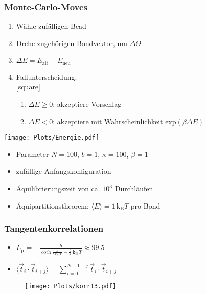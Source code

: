 \begin{frame}
  \frametitle{Monte-Carlo-Moves}
  \begin{enumerate}
    \item Wähle zufälligen Bead
    \item Drehe zugehörigen Bondvektor, um $\Delta\Theta$
    \item $\Delta E = E_{\text{alt}}-E_{\text{neu}}$
    \item Fallunterscheidung:\\
         [square]
         \begin{enumerate}
           \item $\Delta E \geq 0$: akzeptiere Vorschlag
           \item $\Delta E < 0$: akzeptiere mit Wahrscheinlichkeit
                 $\text{exp}(\beta \Delta E)$
         \end{enumerate}
  \end{enumerate}
\end{frame}

\begin{frame}
\begin{minipage}[t]{0.5\textwidth}
\texttt{[image: Plots/Energie.pdf]}
\end{minipage}%
\hfill%
\begin{minipage}{0.5\textwidth}
\begin{itemize}
  \item Parameter $N=100$, $b=1$, $\kappa=100$, $\beta = 1$
  \item zufällige Anfangskonfiguration
  \item Äquilibrierungszeit von ca. $10^3$ Durchläufen
  \item Äquipartitionstheorem: $\langle E \rangle = 1\,\text{k}_{\text{B}}T$
        pro Bond
\end{itemize} \vspace{2.5cm}
\end{minipage}

\end{frame}


\begin{frame}
  \frametitle{Tangentenkorrelationen}
  \begin{itemize}
    \item $L_{\mathrm{p}} = -\frac{b}{\coth \frac{\kappa}{b\,\mathrm{k_B\,T}} - \frac{b}{\kappa}\,\mathrm{k_B} \, T } \approx 99.5 $ \\
    \item $\langle \vec{t}_i \cdot \vec{t}_{i+j} \rangle = \sum_{i=0}^{N-1-j} \vec{t}_i \cdot \vec{t}_{i+j}$
  \end{itemize}
  \begin{figure}
    \centering
    \texttt{[image: Plots/korr13.pdf]}
    \label{fig:tangkorr}
  \end{figure}
\end{frame}

